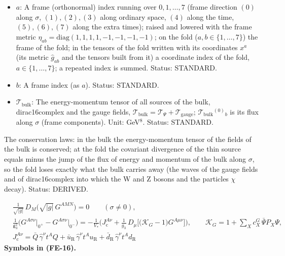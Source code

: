 \documentclass[
  10pt,
]{article}
\begin{document}
\begin{itemize}
  per unit volume of the six other directions of the fold). Unit:
  GeV\(^7\). Value: \(\kappa\mathcal{S}^a{}_b = -12H\delta^a{}_b\) for
  every \(a_4\), \(b_4\) of the author's form. Status: DERIVED.
\item
  \(a\): A frame (orthonormal) index running over \(0, 1, \dots, 7\)
  (frame direction \((0)\) along \(\sigma\), \((1), (2), (3)\) along
  ordinary space, \((4)\) along the time, \((5), (6), (7)\) along the
  extra times); raised and lowered with the frame metric
  \(\eta_{ab} = \mathrm{diag}(1, 1, 1, 1, -1, -1, -1, -1)\); on the fold
  (\(a, b \in \{1, \dots, 7\}\)) the frame of the fold; in the tensors
  of the fold written with its coordinates \(x^a\) (its metric
  \(\hat g_{ab}\) and the tensors built from it) a coordinate index of
  the fold, \(a \in \{1, \dots, 7\}\); a repeated index is summed.
  Status: STANDARD.
\item
  \(b\): A frame index (as \(a\)). Status: STANDARD.
\item
  \(\mathcal{T}_{\mathrm{bulk}}\): The energy-momentum tensor of all
  sources of the bulk, dirac16complex and the gauge fields,
  \(\mathcal{T}_{\mathrm{bulk}} = \mathcal{T}_\Psi + \mathcal{T}_{\mathrm{gauge}}\);
  \(\mathcal{T}_{\mathrm{bulk}}{}^{(0)}{}_b\) is its flux along
  \(\sigma\) (frame components). Unit: GeV\(^8\). Status: STANDARD.
\end{itemize}

The conservation laws: in the bulk the energy-momentum tensor of the
fields of the bulk is conserved; at the fold the covariant divergence of
the thin source equals minus the jump of the flux of energy and momentum
of the bulk along \(\sigma\), so the fold loses exactly what the bulk
carries away (the waves of the gauge fields and of dirac16complex into
which the W and Z bosons and the particles \(\chi\) decay). Status:
DERIVED.

\[
\begin{aligned}
&\frac{1}{\sqrt{\lvert g\rvert}}\,D_M\big(\sqrt{\lvert g\rvert}\,G^{AMN}\big) = 0\qquad (\sigma \ne 0),\\
&\frac{1}{\mathsf{g}_3^2}\Big(G^{A\sigma\nu}\big\vert_{0^+} - G^{A\sigma\nu}\big\vert_{0^-}\Big)
 = -\frac{1}{V_*}\Big(J_{\mathrm{c}}^{A\nu} + \frac{1}{g_3}\,D_\mu\big[\big(\mathcal{K}_{G} - 1\big)G^{A\mu\nu}\big]\Big),\qquad
 \mathcal{K}_{G} = 1 + \sum_X c^{G}_X\,\bar\Psi P_X\Psi,\\
&J_{\mathrm{c}}^{A\nu} = \bar Q\,\hat\gamma^\nu t^AQ + \bar u_{\mathrm{R}}\,\hat\gamma^\nu t^Au_{\mathrm{R}}
 + \bar d_{\mathrm{R}}\,\hat\gamma^\nu t^Ad_{\mathrm{R}}
\end{aligned} \tag{FE-16}
\] \textbf{Symbols in (FE-16).}
\end{document}
